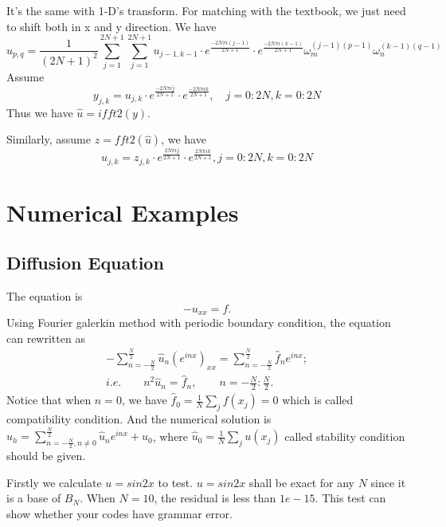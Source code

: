 \documentclass[a4paper]{article}
\begin{document}
It's the same with 1-D's transform. For matching with the textbook, we just need to shift both in x and y direction. We have 
\begin{equation}
    \hat{u}_{p,q}=\frac{1}{(2N+1)^2}\sum_{j=1}^{2N+1}\sum_{j=1}^{2N+1}u_{j-1,k-1}\cdot e^{\frac{-2N\pi i(j-1)}{2N+1}}\cdot e^{\frac{-2N\pi i(k-1)}{2N+1}}\omega_m^{(j-1)(p-1)}\omega_n^{(k-1)(q-1)}
\end{equation}
Assume 
\begin{equation}
    y_{j,k}=u_{j,k}\cdot e^{\frac{-2N\pi ij}{2N+1}}\cdot e^{\frac{-2N\pi ik}{2N+1}},\quad j=0:2N, k=0:2N
\end{equation}
Thus we have $\hat{u}=ifft2(y)$.

Similarly, assume $z=fft2(\hat{u})$, we have 
\begin{equation}
    u_{j,k}=z_{j,k}\cdot e^{\frac{2N\pi ij}{2N+1}}\cdot e^{\frac{2N\pi ik}{2N+1}}, j=0:2N, k=0:2N
\end{equation}

\section{Numerical Examples}
\subsection{Diffusion Equation}
The equation is 
\begin{equation}
    -u_{xx}=f.
\end{equation}
Using Fourier galerkin method with periodic boundary condition, the equation can rewritten as
\begin{equation}
\begin{array}{cc}
    -\sum\limits_{n=-\frac{N}{2}}^{\frac{N}{2}}\hat{u}_n(e^{inx})_{xx}=\sum\limits_{n=-\frac{N}{2}}^{\frac{N}{2}}\hat{f}_ne^{inx};\\
    i.e.\qquad n^2\hat{u}_n=\hat{f}_n,\qquad n=-\frac{N}{2}:\frac{N}{2}.
    \end{array}
\end{equation}
Notice that when $n=0$, we have $\hat{f}_0=\frac{1}{N}\sum\limits_jf(x_j)=0$ which is called compatibility condition. And the numerical solution is $u_h=\sum\limits_{n=-\frac{N}{2},n\neq0}^{\frac{N}{2}}\hat{u}_ne^{inx}+\hat{u}_0$, where $\hat{u}_0=\frac{1}{N}\sum\limits_j u(x_j)$ called stability condition should be given.

Firstly we calculate $u=sin2x$ to test. $u=sin2x$ shall be exact for any $N$ since it is a base of $B_N$.
When $N=10$, the residual is less than $1e-15$. This test can show whether your codes have grammar error.
\end{document}
